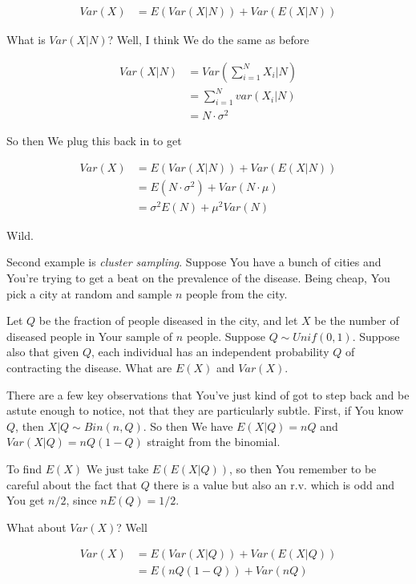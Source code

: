\documentclass{article}
\begin{document}
		\begin{align*}
		Var(X) &= E(Var(X|N)) + Var(E(X|N))
		\end{align*}
			
		What is $Var(X|N)$? Well, I think We do the same as before 
		
		\begin{align*}
		Var(X|N) &= Var\left( \sum^N_{i=1} X_i \bigg| N \right)\\
		&= \sum^N_{i=1} var(X_i|N)\\
		&= N\cdot\sigma^2
		\end{align*}	
			
		So then We plug this back in to get
		
		\begin{align*}
		Var(X) &= E(Var(X|N)) + Var(E(X|N))\\
		&=E(N\cdot\sigma^2) + Var(N\cdot\mu)\\
		&= \sigma^2E(N) + \mu^2 Var(N)
		\end{align*}			
			
		Wild.
		
		Second example is \textit{cluster sampling}. Suppose You have a bunch of cities and You're trying to get a beat on the prevalence of the disease. Being cheap, You pick a city at random and sample $n$ people from the city.
		
		Let $Q$ be the fraction of people diseased in the city, and let $X$ be the number of diseased people in Your sample of $n$ people. Suppose $Q\sim Unif(0, 1)$. Suppose also that given $Q$, each individual has an independent probability $Q$ of contracting the disease. What are $E(X)$ and $Var(X)$.
			
		There are a few key observations that You've just kind of got to step back and be astute enough to notice, not that they are particularly subtle. First, if You know $Q$, then $X|Q\sim Bin(n, Q)$. So then We have $E(X|Q) = nQ$ and $Var(X|Q) = nQ(1-Q)$ straight from the binomial. 
		
		To find $E(X)$ We just take $E(E(X|Q))$, so then You remember to be careful about the fact that $Q$ there is a value but also an r.v. which is odd and You get $n/2$, since $nE(Q) = 1/2$.
		
		What about $Var(X)$? Well
		
		\begin{align*}
		Var(X) &= E(Var(X|Q)) + Var(E(X|Q))\\ 
		&=E(nQ(1-Q)) + Var(nQ)
		\end{align*}
			
\end{document}
